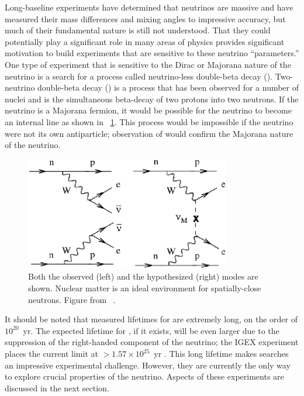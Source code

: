 Long-baseline experiments have determined that neutrinos are massive and have measured their mass differences and mixing angles to impressive accuracy, but much of their fundamental nature is still not understood.  That they could potentially play a significant role in many areas of physics provides significant motivation to build experiments that are sensitive to these neutrino ``parameters.'' One type of experiment that is sensitive to the Dirac or Majorana nature of the neutrino is a search for a process called neutrino-less double-beta decay (\zvbb).  Two-neutrino double-beta decay (\tvbb) is a process that has been observed for a number of nuclei and is the simultaneous beta-decay of two protons into two neutrons.  If the neutrino is a Majorana fermion, it would be possible for the neutrino to become an internal line as shown in {\fig}~\ref{fig:zvbb}.  This process would be impossible if the neutrino were not its own antiparticle; observation of \zvbb would confirm the Majorana nature of the neutrino. 
\begin{figure}[htp]
\centering
\includegraphics[width=0.8\textwidth]{figures/feynman2.eps}
\caption[Feynman diagrams describing \tvbb and \zvbb.]{Both the observed \tvbb (left) and the hypothesized \zvbb (right) modes are shown.  Nuclear matter is an ideal environment for spatially-close neutrons.  Figure from {}~\citep{zvbbReview_Elliott}.}
\label{fig:zvbb}
\end{figure}
It should be noted that measured lifetimes for \tvbb are extremely long, on the order of $10^{20}$~yr.  The expected lifetime for \zvbb, if it exists, will be even larger due to the suppression of the right-handed component of the neutrino; the IGEX experiment places the current limit at $>1.57\times 10^{25}$~yr \citep{IGEX}.  This long lifetime makes \zvbb searches an impressive experimental challenge.  However, they are currently the only way to explore crucial properties of the neutrino.  Aspects of these experiments are discussed in the next section.


